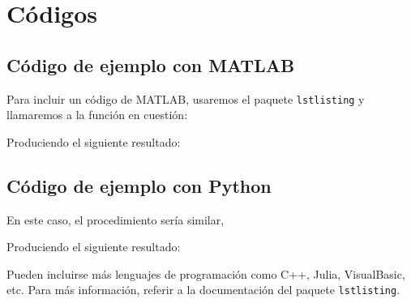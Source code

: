 \chapter{Códigos}\label{ch: A}
\section*{Código de ejemplo con MATLAB} 
Para incluir un código de MATLAB, usaremos el paquete \texttt{lstlisting} y llamaremos a la función en cuestión: \lstinline!!


Produciendo el siguiente resultado:

\newpage
\section*{Código de ejemplo con Python}
En este caso, el procedimiento sería similar, \lstinline!!


Produciendo el siguiente resultado:


Pueden incluirse más lenguajes de programación como C++, Julia, VisualBasic, etc. Para más información, referir a la documentación del paquete \texttt{lstlisting}.

